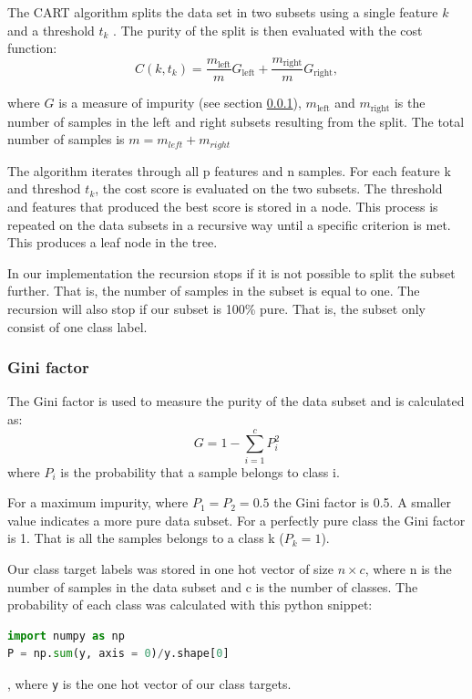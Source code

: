 The CART algorithm splits the data set in two subsets using a single feature
$k$ and a threshold $t_k$ \cite{w44}. The purity of the split is then evaluated
with the cost function: 
\begin{equation*}
    \label{eq:cart} 
    C(k, t_k) = \frac{m_{\text{left}} }{m} G_{\text{left}}+
    \frac{m_{\text{right}} }{m} G_{\text{right}}, 
\end{equation*}

where $G$ is a measure of impurity (see section \ref{sec:gini_factor}),
$m_{\text{left}} $ and $m_{\text{right}} $ is the number of samples in the left
and right subsets resulting from the split. The total number of samples is $m =
m_{left} + m_{right}  $ 

The algorithm iterates through all p features and n samples. For each feature k
and threshod $t_k$, the cost score is evaluated on the two subsets. The
threshold and features that produced the best score is stored in a node. This
process is repeated on the data subsets in a recursive way until a specific
criterion is met. This produces a leaf node in the tree. 

In our implementation the recursion stops if it is not possible to split the
subset further. That is, the number of samples in the subset is equal to one.   
The recursion will also stop if our subset is 100\% pure. That is, the subset
only consist of one class label.  

\subsubsection{Gini factor} \label{sec:gini_factor} \hfill

The Gini factor is used to measure the purity of the data subset and is
calculated as:
\begin{equation*}
    G = 1 - \sum_{i=1}^{c} P_i ^2 
\end{equation*}
where $P_i$ is the probability that a sample belongs to class i. 

For a maximum impurity, where $P_1 = P_2 = 0.5$ the Gini factor is 0.5. A
smaller value indicates a more pure data subset. For a perfectly pure class the Gini
factor is 1. That is all the samples belongs to a class k ($P_k = 1$).     


Our class target labels was stored in one hot vector of size $n \times c$, 
where n is the number of samples in the data subset and c is the number of
classes. The probability of each class was calculated with this python snippet:
\begin{lstlisting}[language=Python]
import numpy as np
P = np.sum(y, axis = 0)/y.shape[0]
\end{lstlisting},
where \verb|y| is the one hot vector of our class targets. 

